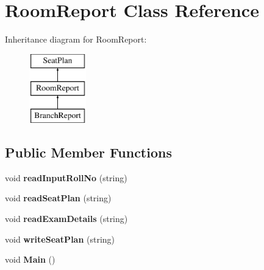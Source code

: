 \hypertarget{classRoomReport}{\section{Room\-Report Class Reference}
\label{classRoomReport}
}
Inheritance diagram for Room\-Report\-:\begin{figure}[H]
\begin{center}
\leavevmode
\includegraphics[height=3.000000cm]{classRoomReport}
\end{center}
\end{figure}
\subsection*{Public Member Functions}
\begin{DoxyCompactItemize}
\item 
\hypertarget{classRoomReport_a6befa64df45c74ac5d4810d3b0abdb2c}{void {\bfseries read\-Input\-Roll\-No} (string)}\label{classRoomReport_a6befa64df45c74ac5d4810d3b0abdb2c}

\item 
\hypertarget{classRoomReport_a488ef42cd98cf26383c5753af972dfde}{void {\bfseries read\-Seat\-Plan} (string)}\label{classRoomReport_a488ef42cd98cf26383c5753af972dfde}

\item 
\hypertarget{classRoomReport_a74d8d4a54ab1a80d84c059827ec3c4f6}{void {\bfseries read\-Exam\-Details} (string)}\label{classRoomReport_a74d8d4a54ab1a80d84c059827ec3c4f6}

\item 
\hypertarget{classRoomReport_a3704858e3ace6b7ef0104bdbecf745db}{void {\bfseries write\-Seat\-Plan} (string)}\label{classRoomReport_a3704858e3ace6b7ef0104bdbecf745db}

\item 
\hypertarget{classRoomReport_aa6eff185efa1c6205ec1446ed66d9766}{void {\bfseries Main} ()}\label{classRoomReport_aa6eff185efa1c6205ec1446ed66d9766}

\end{DoxyCompactItemize}
